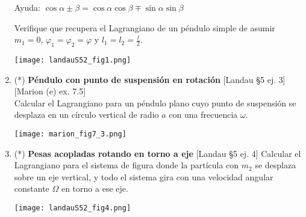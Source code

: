 \documentclass[11pt,spanish,a4paper]{article}
\begin{document}
\begin{enumerate}
\begin{minipage}[t][4.5cm]{0.7\textwidth}
Ayuda: \( \cos{\alpha \pm \beta }=\cos{ \alpha} \cos{ \beta \mp \sin \alpha} \sin{ \beta } \)

Verifique que recupera el Lagrangiano de un péndulo simple de asumir \(m_1=0\), \(\varphi_1 = \varphi_2 = \varphi\) y \(l_1 = l_2 = \frac{l}{2}\).
\end{minipage}
	\begin{minipage}[c][2.5cm][t]{0.3\textwidth}
	\texttt{[image: landauS52\_fig1.png]}
\end{minipage}



\item \begin{minipage}[t][4.5cm]{0.7\textwidth}
(*) \textbf{Péndulo con punto de suspensión en rotación} [Landau \S5 ej. 3] [Marion (e) ex. 7.5]\\
Calcular el Lagrangiano para un péndulo plano cuyo punto de suspensión se desplaza en un círculo vertical de radio \(a\) con una frecuencia \(\omega\).
\end{minipage}
	\begin{minipage}[c][2.5cm][t]{0.3\textwidth}
	\texttt{[image: marion\_fig7\_3.png]}
\end{minipage}



\item \begin{minipage}[t][4.5cm]{0.7\textwidth}
(*) \textbf{Pesas acopladas rotando en torno a eje} [Landau \S5 ej. 4]
Calcular el Lagrangiano para el sistema de figura donde la partícula con \(m_2\) se desplaza sobre un eje vertical, y todo el sistema gira con una velocidad angular constante \(\Omega\) en torno a ese eje.
\end{minipage}
	\begin{minipage}[c][2.5cm][t]{0.3\textwidth}
	\texttt{[image: landauS52\_fig4.png]}
\end{minipage}



\end{enumerate}
\end{document}

